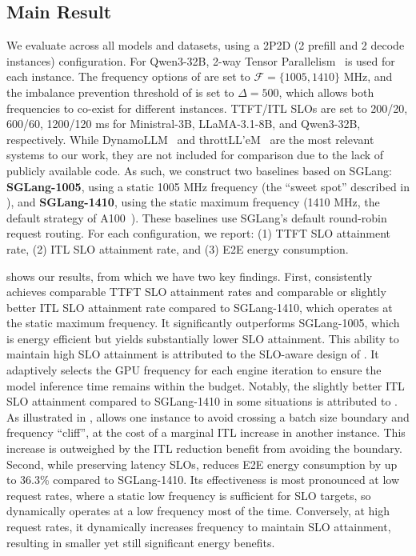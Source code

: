 \subsection{Main Result}
\label{subsec:main-result}


We evaluate \name across all models and datasets, using a 2P2D (2 prefill and 2 decode instances) configuration. 
For Qwen3-32B, 2-way Tensor Parallelism~\cite{shoeybi2019megatron} is used for each instance.
The frequency options of \governor are set to $\mathcal{F}=\{1005, 1410\}$ MHz, and the imbalance prevention threshold of \router is set to $\Delta=500$, which allows both frequencies to co-exist for different instances.
TTFT/ITL SLOs are set to 200/20, 600/60, 1200/120 ms for Ministral-3B, LLaMA-3.1-8B, and Qwen3-32B, respectively.
While DynamoLLM~\cite{stojkovic2025dynamollm} and throttLL’eM~\cite{kakolyris2025throttll} are the most relevant systems to our work, they are not included for comparison due to the lack of publicly available code.
As such, we construct two baselines based on SGLang:
\textbf{SGLang-1005}, using a static 1005 MHz frequency (the ``sweet spot'' described in ), and \textbf{SGLang-1410}, using the static maximum frequency (1410 MHz, the default strategy of A100~\cite{vspetko2021dgx}).
These baselines use SGLang's default round-robin request routing.
For each configuration, we report: (1) TTFT SLO attainment rate, (2) ITL SLO attainment rate, and (3) E2E energy consumption.


 shows our results, from which we have two key findings.
First, \name consistently achieves comparable TTFT SLO attainment rates and comparable or slightly better ITL SLO attainment rate compared to SGLang-1410, which operates at the static maximum frequency.
It significantly outperforms  SGLang-1005, which is energy efficient but yields substantially lower SLO attainment.
This ability to maintain high SLO attainment is attributed to the SLO-aware design of \governor.
It adaptively selects the GPU frequency for each engine iteration to ensure the model inference time remains within the budget.
Notably, the slightly better ITL SLO attainment compared to SGLang-1410 in some situations is attributed to \router.
As illustrated in , \router allows one instance to avoid crossing a batch size boundary and frequency ``cliff'', at the cost of a marginal ITL increase in another instance.
This increase is outweighed by the ITL reduction benefit from avoiding the boundary.
Second, while preserving latency SLOs, \name reduces E2E energy consumption by up to 36.3\% compared to SGLang-1410.
Its effectiveness is most pronounced at low request rates, where a static low frequency is sufficient for SLO targets, so \name dynamically operates at a low frequency most of the time.
Conversely, at high request rates, it dynamically increases frequency to maintain SLO attainment, resulting in smaller yet still significant energy benefits.

